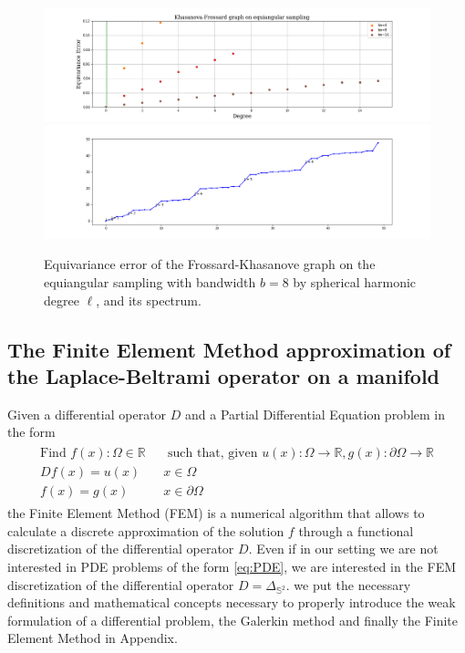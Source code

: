 \begin{figure}[h!]
	\centering
	\includegraphics[width=\textwidth]{../codes/06.Equivariance_error/KhasanovaFrossardgraphonequiangularsampling.png}
	\includegraphics[width=\textwidth]{../codes/02.HeatKernelGraphLaplacian/equiangular/equi_full_Khasanova_Frossard_eigenvalues_16.png}
	\caption{\label{fig:Equivariance error of the Frossard-Khasanove graph}Equivariance error of the Frossard-Khasanove graph on the equiangular sampling with bandwidth $b=8$ by spherical harmonic degree $\ell$, and its spectrum.}
\end{figure}

\subsection{The Finite Element Method approximation of the Laplace-Beltrami operator on a manifold}\label{sec:Chapter3: Using the Finite Element Method to approximate the Laplace-Beltrami operator on a manifold}
Given a differential operator $D$ and a Partial Differential Equation problem in the form
\begin{align}\label{eq:PDE}
\begin{split}
\text{Find } f(x):\Omega\in\mathbb R &\text{ such that, given }u(x):\Omega\to\mathbb R, g(x):\partial\Omega\to\mathbb R\\
Df(x)=u(x)\quad&x\in\Omega\\
f(x)=g(x)\quad &x\in\partial\Omega
\end{split}
\end{align}
the Finite Element Method (FEM) is a numerical algorithm that allows to calculate a discrete approximation of the solution $f$ through a functional discretization of the differential operator $D$. Even if in our setting we are not interested in PDE problems of the form \ref{eq:PDE}, we are interested in the FEM discretization of the differential operator $D=\Delta_{\mathbb S^2}$. we put the necessary definitions and mathematical concepts necessary to properly introduce the weak formulation of a differential problem, the Galerkin method and finally the Finite Element Method in Appendix.\\
